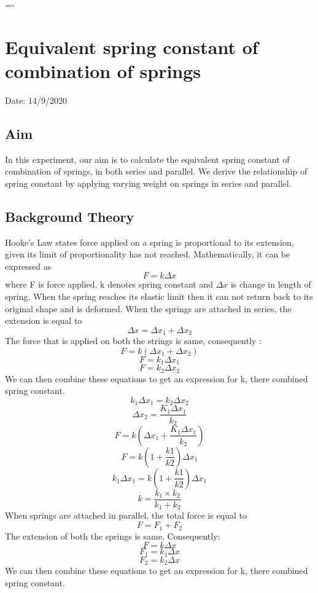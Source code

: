 

=-\chapter{Equivalent spring constant of combination of springs}

Date: 14/9/2020


\section{Aim}

In this experiment, our aim is to calculate the equivalent spring constant of combination of springs, in both series and parallel. We derive the relationship of spring constant by applying varying weight on springs in series and parallel.


\section{Background Theory}

Hooke's Law states force applied on a spring is proportional to its extension, given its limit of proportionality has not reached. Mathematically, it can be expressed as $$ F= k \Delta x $$ where F is force applied, k denotes spring constant and $\Delta x$ is change in length of spring. When the spring reaches its elastic limit then it can not return back to its original shape and is deformed. 
When the springs are attached in series, the extension is equal to
    $$ \Delta x = \Delta x_1 + \Delta x_2 $$
The force that is applied  on both the strings is same, consequently :
    $$ F = k(\Delta x_1 + \Delta x_2) $$
    $$ F = k_1 \Delta x_1 $$
    $$ F = k_2 \Delta x_2 $$
We can then combine these equations to get an expression for k, there combined spring constant.
    $$ k_1 \Delta x_1 =  k_2 \Delta x_2 $$
    $$ \Delta x_2 = \frac{K_1 \Delta x_1}{k_2} $$
    $$ F = k(\Delta x_1 + \frac{K_1 \Delta x_1}{k_2}) $$ 
    $$ F = k(1 + \frac{k1}{k2}) \Delta x_1 $$
    $$ k_1 \Delta x_1 = k(1 + \frac{k1}{k2}) \Delta x_1 $$
    $$ k = \frac{k_1 \times k_2}{k_1 +k_2} $$
When springs are attached in parallel, the total force is equal to
    $$ F = F_1 + F_2 $$
The extension of both the springs is same, Consequently:
    $$ F = k \Delta x $$
    $$ F_1 = k_1 \Delta x $$
    $$ F_2 = k_2 \Delta x $$
We can then combine these equations to get an expression for k,
there combined spring constant.

